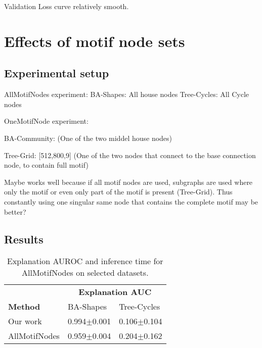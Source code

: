Validation Loss curve relatively smooth.

\section{Effects of motif node sets}

\subsection{Experimental setup}

AllMotifNodes experiment:
BA-Shapes: All house nodes
Tree-Cycles: All Cycle nodes
\bigskip


OneMotifNode experiment:

BA-Community:
(One of the two middel house nodes)

Tree-Grid:
[512,800,9]
(One of the two nodes that connect to the base connection node, to contain full motif)

Maybe works well because if all motif nodes are used, subgraphs are used where only the motif or even only part of the motif is present (Tree-Grid). Thus constantly using one singular same node that contains the complete motif may be better?


\subsection{Results}

\begin{table}[ht]
    \centering
    \scriptsize
    \begin{tabularx}{0.6\textwidth}{l*{2}{X}}   %
    \toprule
    \textbf{} & \multicolumn{2}{c}{\textbf{Explanation AUC}} \\
    \cmidrule{2-3}
    \textbf{Method} & BA-Shapes & Tree-Cycles \\
    \midrule
    Our work & 0.994$\pm$0.001 & 0.106$\pm$0.104 \\
    \midrule
    AllMotifNodes & 0.959$\pm$0.004 & 0.204$\pm$0.162 \\
    \bottomrule
    \end{tabularx}
    \caption{Explanation AUROC and inference time for AllMotifNodes on selected datasets.}
    \label{tab:allmotifnodes_selected}
\end{table}

